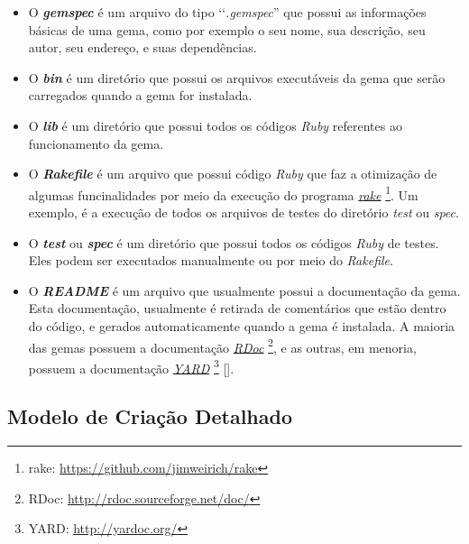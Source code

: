 \begin{itemize}

 \item O \emph{\textbf{gemspec}} é um arquivo do tipo ‘‘\emph{.gemspec}'' que possui as informações básicas
 de uma gema, como por exemplo o seu nome, sua descrição, seu autor, seu endereço, e suas dependências.

 \item O \emph{\textbf{bin}} é um diretório que possui os arquivos executáveis da gema que serão
 carregados quando a gema for instalada.

 \item O \emph{\textbf{lib}} é um diretório que possui todos os códigos \emph{Ruby} referentes ao
 funcionamento da gema.

 \item O \emph{\textbf{Rakefile}} é um arquivo que possui código \emph{Ruby} que faz a otimização de algumas
 funcinalidades por meio da execução do programa \emph{\href{https://github.com/jimweirich/rake}{rake}}
 \footnote{rake: \url{https://github.com/jimweirich/rake}}. Um exemplo, é a execução de todos os arquivos
 de testes do diretório \emph{test} ou \emph{spec}.
 
 \item O \emph{\textbf{test}} ou \emph{\textbf{spec}} é um diretório que possui todos os códigos \emph{Ruby}
 de testes. Eles podem ser executados manualmente ou por meio do \emph{Rakefile}.

 \item O \emph{\textbf{README}} é um arquivo que usualmente possui a documentação da gema. Esta
 documentação, usualmente é retirada de comentários que estão dentro do código, e gerados automaticamente
 quando a gema é instalada. A maioria das gemas possuem a documentação
 \emph{\href{http://rdoc.sourceforge.net/doc/}{RDoc}} \footnote{RDoc: \url{http://rdoc.sourceforge.net/doc/}},
 e as outras, em menoria, possuem a documentação \emph{\href{http://yardoc.org/}{YARD}}
 \footnote{YARD: \url{http://yardoc.org/}} [].

\end{itemize}


\subsection{Modelo de Criação Detalhado}
\label{subsection:modelo_de_criação_detalhado}


